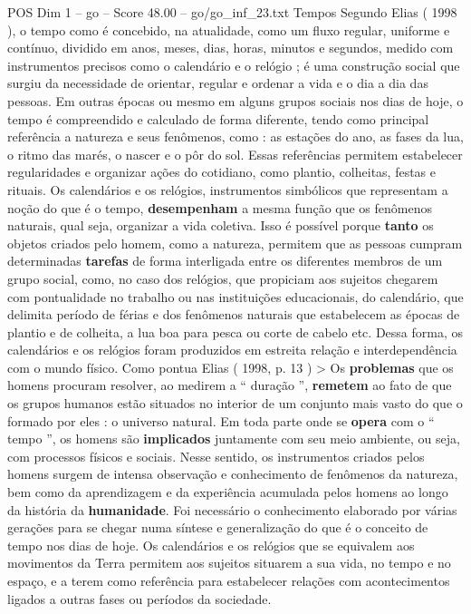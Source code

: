 \begin{textsample}{POS Dim 1 – go – Score 48.00 – go/go\_inf\_23.txt}
Tempos Segundo Elias ( 1998 ), o tempo como é concebido, na atualidade, como um fluxo regular, uniforme e contínuo, dividido em anos, meses, dias, horas, minutos e segundos, medido com instrumentos precisos como o calendário e o relógio ; é uma construção social que surgiu da necessidade de orientar, regular e ordenar a vida e o dia a dia das pessoas.
Em outras épocas ou mesmo em alguns grupos sociais nos dias de hoje, o tempo é compreendido e calculado de forma diferente, tendo como principal referência a natureza e seus fenômenos, como : as estações do ano, as fases da lua, o ritmo das marés, o nascer e o pôr do sol.
Essas referências permitem estabelecer regularidades e organizar ações do cotidiano, como plantio, colheitas, festas e rituais.
Os calendários e os relógios, instrumentos simbólicos que representam a noção do que é o tempo, \textbf{desempenham} a mesma função que os fenômenos naturais, qual seja, organizar a vida coletiva.
Isso é possível porque \textbf{tanto} os objetos criados pelo homem, como a natureza, permitem que as pessoas cumpram determinadas \textbf{tarefas} de forma interligada entre os diferentes membros de um grupo social, como, no caso dos relógios, que propiciam aos sujeitos chegarem com pontualidade no trabalho ou nas instituições educacionais, do calendário, que delimita período de férias e dos fenômenos naturais que estabelecem as épocas de plantio e de colheita, a lua boa para pesca ou corte de cabelo etc.
Dessa forma, os calendários e os relógios foram produzidos em estreita relação e interdependência com o mundo físico.
Como pontua Elias ( 1998, p. 13 ) > Os \textbf{problemas} que os homens procuram resolver, ao medirem a “ duração ”, \textbf{remetem} ao fato de que os grupos humanos estão situados no interior de um conjunto mais vasto do que o formado por eles : o universo natural.
Em toda parte onde se \textbf{opera} com o “ tempo ”, os homens são \textbf{implicados} juntamente com seu meio ambiente, ou seja, com processos físicos e sociais.
Nesse sentido, os instrumentos criados pelos homens surgem de intensa observação e conhecimento de fenômenos da natureza, bem como da aprendizagem e da experiência acumulada pelos homens ao longo da história da \textbf{humanidade}.
Foi necessário o conhecimento elaborado por várias gerações para se chegar numa síntese e generalização do que é o conceito de tempo nos dias de hoje.
Os calendários e os relógios que se equivalem aos movimentos da Terra permitem aos sujeitos situarem a sua vida, no tempo e no espaço, e a terem como referência para estabelecer relações com acontecimentos ligados a outras fases ou períodos da sociedade.

\end{textsample}
